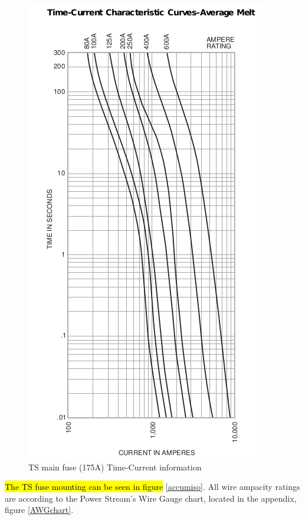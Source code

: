 \documentclass{article}
\DeclareRobustCommand{\hlr}[1]{{\sethlcolor{red}\hl{#1}}}
\begin{document}
            \begin{figure}[H]
                \centering
                \includegraphics[width = 0.25 \textheight]{TSfuseT-Agraph}
                \caption{TS main fuse (175A) Time-Current information}
                \label{TSi2t}
            \end{figure}

            \hlr{The TS fuse mounting can be seen in figure} \ref{accumiso}.
            All wire ampacity ratings are according to the Power Stream's Wire Gauge chart, located in the appendix, figure \ref{AWGchart}.
\end{document}
